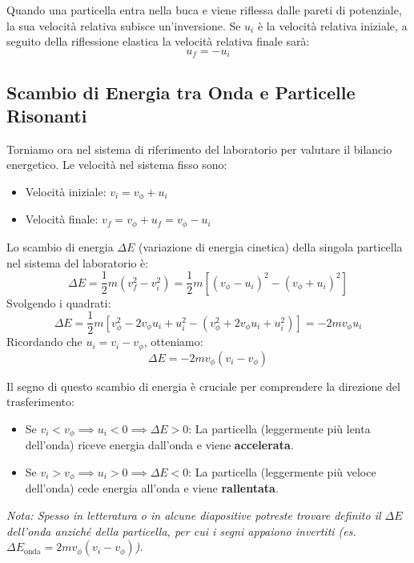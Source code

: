 Quando una particella entra nella buca e viene riflessa dalle pareti di potenziale, la sua velocità relativa subisce un'inversione. Se $u_i$ è la velocità relativa iniziale, a seguito della riflessione elastica la velocità relativa finale sarà:
\begin{equation}
u_f = - u_i
\end{equation}

\subsection{Scambio di Energia tra Onda e Particelle Risonanti}
Torniamo ora nel sistema di riferimento del laboratorio per valutare il bilancio energetico. Le velocità nel sistema fisso sono:
\begin{itemize}
\item Velocità iniziale: $v_i = v_\phi + u_i$
\item Velocità finale: $v_f = v_\phi + u_f = v_\phi - u_i$
\end{itemize}

Lo scambio di energia $\Delta E$ (variazione di energia cinetica) della singola particella nel sistema del laboratorio è:
\begin{equation}
\Delta E = \frac{1}{2} m \left( v_f^2 - v_i^2 \right) = \frac{1}{2} m \left[ (v_\phi - u_i)^2 - (v_\phi + u_i)^2 \right]
\end{equation}
Svolgendo i quadrati:
\begin{equation}
\Delta E = \frac{1}{2} m \left[ v_\phi^2 - 2v_\phi u_i + u_i^2 - (v_\phi^2 + 2v_\phi u_i + u_i^2) \right] = - 2 m v_\phi u_i
\end{equation}
Ricordando che $u_i = v_i - v_\phi$, otteniamo:
\begin{equation}
\Delta E = - 2 m v_\phi (v_i - v_\phi)
\end{equation}

Il segno di questo scambio di energia è cruciale per comprendere la direzione del trasferimento:
\begin{itemize}
\item Se $v_i < v_\phi \implies u_i < 0 \implies \Delta E > 0$: La particella (leggermente più lenta dell'onda) riceve energia dall'onda e viene \textbf{accelerata}.
\item Se $v_i > v_\phi \implies u_i > 0 \implies \Delta E < 0$: La particella (leggermente più veloce dell'onda) cede energia all'onda e viene \textbf{rallentata}.
\end{itemize}
\textit{Nota: Spesso in letteratura o in alcune diapositive potreste trovare definito il $\Delta E$ dell'onda anziché della particella, per cui i segni appaiono invertiti (es. $\Delta E_{\text{onda}} = 2m v_\phi(v_i - v_\phi)$).}

